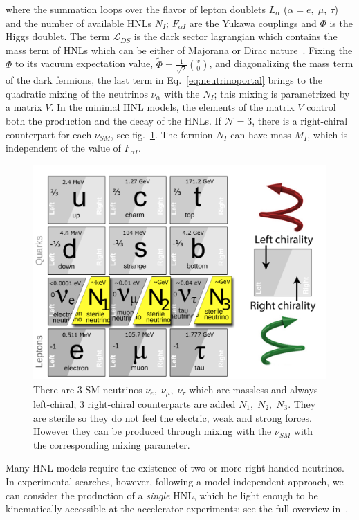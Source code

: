 where the summation loops over the flavor of lepton doublets
${L}_{\alpha}$ ($\alpha = e,\; \mu, \: \tau$) and the number of
available HNLs $N_{I}$; $F_{\alpha I} $ are the Yukawa couplings and
$\Phi$ is the Higgs doublet. The term $\mathcal{L}_{DS}$ is the dark
sector lagrangian which contains the mass term of HNLs which can be
either of Majorana or Dirac nature~\cite{Alekhin_2016}.
Fixing the $\Phi$ to its vacuum expectation value, $\widetilde \Phi = \frac{1}{\sqrt{2}} \binom{v}{0}$, and diagonalizing the mass term of the dark fermions, the last term in Eq.~\ref{eq:neutrinoportal} brings to the quadratic mixing of the neutrinos $\nu_{\alpha}$ with the $N_{I}$; this mixing is parametrized by a matrix $V$. In the minimal HNL models, the elements of the matrix $V$ control both the production and the decay of the HNLs. 
If $\mathcal{N} = 3$, there is a right-chiral counterpart for each $\nu_{SM}$, see fig.~\ref{fig:c3sm_extension}. The fermion $N_I$ can have mass $M_I$, which is independent  of the value of $F_{\alpha I}$.
\begin{figure}[t!]
  \centering
  \includegraphics[width=.60\textwidth]{Figures/c3/SM_extension}
    \caption{There are 3 SM neutrinos $\nu_{e}, \; \nu_{\mu}, \;\nu_{\tau}$ which are massless and always left-chiral; 3 right-chiral counterparts are added $N_{1}, \; N_{2}, \;N_{3}$. They are sterile so they do not feel the electric, weak and strong forces. However they can be produced through mixing with the $\nu_{SM}$ with the corresponding mixing parameter.}
  \label{fig:c3sm_extension}
\end{figure}

Many HNL models require the existence of two or more right-handed neutrinos. In experimental searches, however, following a model-independent approach, we can consider the production of a \emph{single} HNL, which be light enough to be kinematically accessible at the accelerator experiments; see the full overview in~\cite{Atre_2009}. 

